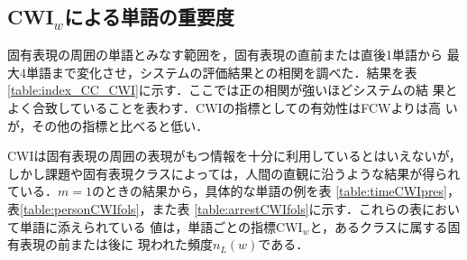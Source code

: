 \subsection{CWI$_w$による単語の重要度}

固有表現の周囲の単語とみなす範囲を，固有表現の直前または直後1単語から
最大4単語まで変化させ，システムの評価結果との相関を調べた．結果を表
\ref{table:index_CC_CWI}に示す．ここでは正の相関が強いほどシステムの結
果とよく合致していることを表わす．CWIの指標としての有効性はFCWよりは高
いが，その他の指標と比べると低い．

CWIは固有表現の周囲の表現がもつ情報を十分に利用しているとはいえないが，
しかし課題や固有表現クラスによっては，人間の直観に沿うような結果が得られ
ている．\(m=1\)のときの結果から，具体的な単語の例を表
\ref{table:timeCWIpres}，表\ref{table:personCWIfols}，また表
\ref{table:arrestCWIfols}に示す．これらの表において単語に添えられている
値は，単語ごとの指標CWI$_w$と，あるクラスに属する固有表現の前または後に
現われた頻度\(n_L(w)\)である．

